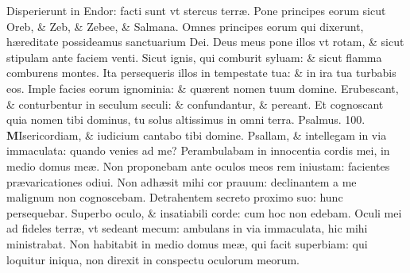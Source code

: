 \documentclass[a5paper,10pt]{book}
\def\ae{æ}
\begin{document}
\begin{multicols*}{2}
\newline \color{red} D\color{black}isperierunt in Endor: facti sunt vt stercus terr\ae .
\newline \color{red} P\color{black}one principes eorum sicut Oreb, \& Zeb, \& Zebee, \& Salmana.
\newline \color{red} O\color{black}mnes principes eorum qui dixerunt, h\ae reditate possideamus sanctuarium Dei.
\newline \color{red} D\color{black}eus meus pone illos vt rotam, \& sicut stipulam ante faciem venti.
\newline \color{red} S\color{black}icut ignis, qui comburit syluam: \& sicut flamma comburens montes.
\newline \color{red} I\color{black}ta persequeris illos in tempestate tua: \& in ira tua turbabis eos.
\newline \color{red} I\color{black}mple facies eorum ignominia: \& qu\ae rent nomen tuum domine.
\newline \color{red} E\color{black}rubescant, \& conturbentur in seculum seculi: \& confundantur, \& pereant.
\newline \color{red} E\color{black}t cognoscant quia nomen tibi dominus, tu solus altissimus in omni terra.
\newline \color{red} Psalmus. 100. \color{black}
\lettrine[lines=2]{\bfseries \color{red} M}{}Isericordiam, \& iudicium cantabo tibi domine.
\newline \color{red} P\color{black}sallam, \& intellegam in via immaculata: quando venies ad me?
\newline \color{red} P\color{black}erambulabam in innocentia cordis mei, in medio domus me\ae .
\newline \color{red} N\color{black}on proponebam ante oculos meos rem iniustam: facientes pr\ae varicationes odiui.
\newline \color{red} N\color{black}on adh\ae sit mihi cor prauum: declinantem a me malignum non cognoscebam.
\newline \color{red} D\color{black}etrahentem secreto proximo suo: hunc persequebar.
\newline \color{red} S\color{black}uperbo oculo, \& insatiabili corde: cum hoc non edebam.
\newline \color{red} O\color{black}culi mei ad fideles terr\ae , vt sedeant mecum: ambulans in via immaculata, hic mihi ministrabat.
\newline \color{red} N\color{black}on habitabit in medio domus me\ae , qui facit superbiam: qui loquitur iniqua, non direxit in conspectu oculorum meorum.

\end{multicols*}
\end{document}
